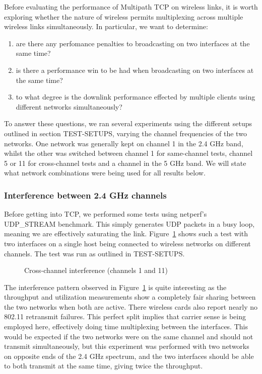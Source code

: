 Before evaluating the performance of Multipath TCP on wireless links, it is
worth exploring whether the nature of wireless permits multiplexing across
multiple wireless links simultaneously. In particular, we want to determine:

\begin{enumerate}
  \item are there any perfomance penalties to broadcasting on two interfaces at
    the same time?
  \item is there a performance win to be had when broadcasting on two
    interfaces at the same time?
  \item to what degree is the downlink performance effected by multiple clients
    using different networks simultaneously?
\end{enumerate}

To answer these questions, we ran several experiments using the different
setups outlined in section TEST-SETUPS, varying the channel frequencies of the %
two networks. One network was generally kept on channel 1 in the 2.4 GHz band,
whilst the other was switched between channel 1 for same-channel tests, channel
5 or 11 for cross-channel tests and a channel in the 5 GHz band. We will state
what network combinations were being used for all results below.

\subsubsection{Interference between 2.4 GHz channels}

Before getting into TCP, we performed some tests using netperf's UDP\_STREAM
benchmark. This simply generates UDP packets in a busy loop, meaning we are
effectively saturating the link. Figure~\ref{graph:cc-interference} shows such a
test with two interfaces on a single host being connected to wireless networks
on different channels. The test was run as outlined in TEST-SETUPS.            %

\begin{figure}[h]
 \centering
 
 \caption{Cross-channel interference (channels 1 and 11)}\label{graph:cc-interference}
\end{figure}

The interference pattern observed in Figure~\ref{graph:cc-interference} is quite
interesting as the throughput and utilization measurements show a completely
fair sharing between the two networks when both are active. There wireless cards
also report nearly no 802.11 retransmit failures. This perfect split implies
that carrier sense is being employed here, effectively doing time multiplexing
between the interfaces. This would be expected if the two networks were on the
same channel and should not transmit simultaneously, but this experiment was
performed with two networks on opposite ends of the 2.4 GHz spectrum, and the two
interfaces should be able to both transmit at the same time, giving twice the
throughput.

